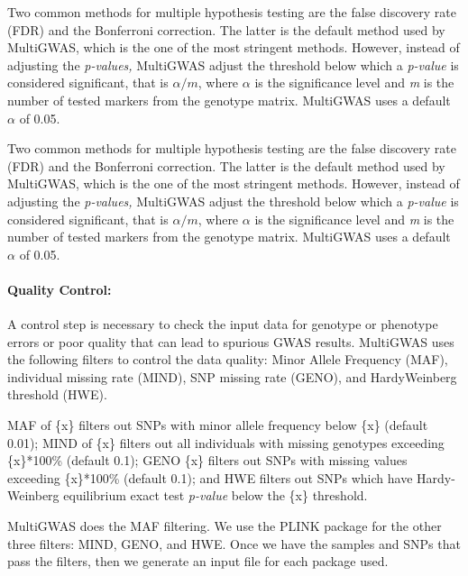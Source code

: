 Two common methods for multiple hypothesis testing are the false discovery rate (FDR) and the Bonferroni correction. The latter is the default method used by MultiGWAS, which is the one of the most stringent methods. However, instead of adjusting the \emph{p-values,} MultiGWAS adjust the threshold below which a \emph{p-value} is considered significant, that is $\alpha/m$, where $\alpha$ is the significance level and \emph{m }is the number of tested markers from the genotype matrix. MultiGWAS uses a default $\alpha$ of 0.05. 





Two common methods for multiple hypothesis testing are the false discovery rate (FDR) and the Bonferroni correction. The latter is the default method used by MultiGWAS, which is the one of the most stringent methods. However, instead of adjusting the \emph{p-values,} MultiGWAS adjust the threshold below which a \emph{p-value} is considered significant, that is $\alpha/m$, where $\alpha$ is the significance level and \emph{m }is the number of tested markers from the genotype matrix. MultiGWAS uses a default $\alpha$ of 0.05. 





\paragraph{Quality Control:}
A control step is necessary to check the input data for genotype or phenotype errors or poor quality that can lead to spurious GWAS results. MultiGWAS uses the following filters to control the data quality: Minor Allele Frequency (MAF), individual missing rate (MIND), SNP missing rate (GENO), and Hardy\-Weinberg threshold (HWE). 

MAF of \{x\} filters out SNPs with minor allele frequency below \{x\} (default 0.01); MIND of \{x\} filters out all individuals with missing genotypes exceeding \{x\}{*}100\% (default 0.1); GENO \{x\} filters out SNPs with missing values exceeding \{x\}{*}100\% (default 0.1); and HWE filters out SNPs which have Hardy-Weinberg equilibrium exact test \emph{p-value} below the \{x\} threshold.

MultiGWAS does the MAF filtering. We use the PLINK package \cite{Gumpinger2018} for the other three filters: MIND, GENO, and HWE. Once we have the samples and SNPs that pass the filters, then we generate an input file for each package used. 
